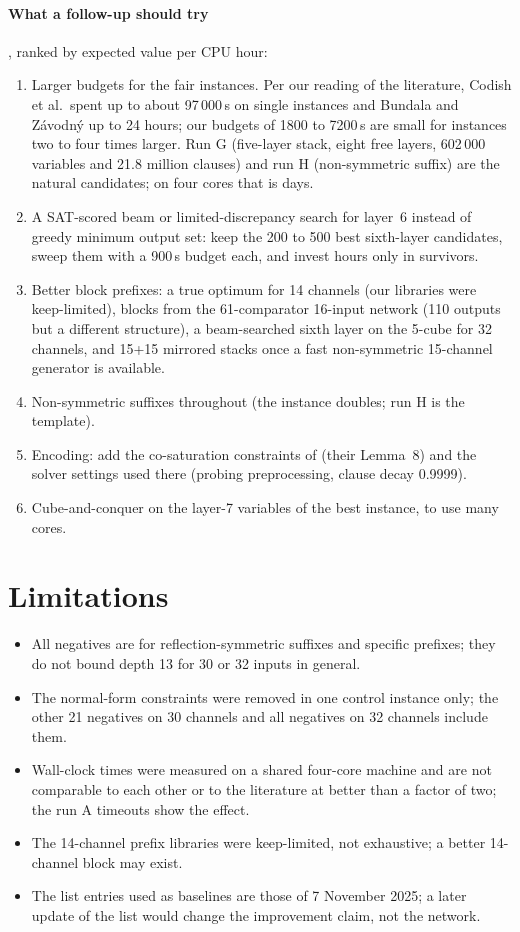 \documentclass[11pt,a4paper]{article}
\theoremstyle{plain}
\theoremstyle{definition}
\theoremstyle{remark}
\begin{document}
\paragraph{What a follow-up should try}, ranked by expected value per CPU hour:
\begin{enumerate}
\item Larger budgets for the fair instances. Per our reading of the literature, Codish et al.\ spent up to about 97\,000\,s on single instances and Bundala and Z\'avodn\'y up to 24 hours; our budgets of 1800 to 7200\,s are small for instances two to four times larger. Run G (five-layer stack, eight free layers, 602\,000 variables and 21.8 million clauses) and run H (non-symmetric suffix) are the natural candidates; on four cores that is days.
\item A SAT-scored beam or limited-discrepancy search for layer~6 instead of greedy minimum output set: keep the 200 to 500 best sixth-layer candidates, sweep them with a 900\,s budget each, and invest hours only in survivors.
\item Better block prefixes: a true optimum for 14 channels (our libraries were keep-limited), blocks from the 61-comparator 16-input network (110 outputs but a different structure), a beam-searched sixth layer on the 5-cube for 32 channels, and 15+15 mirrored stacks once a fast non-symmetric 15-channel generator is available.
\item Non-symmetric suffixes throughout (the instance doubles; run H is the template).
\item Encoding: add the co-saturation constraints of \cite{CCEMS19} (their Lemma~8) and the solver settings used there (probing preprocessing, clause decay 0.9999).
\item Cube-and-conquer on the layer-7 variables of the best instance, to use many cores.
\end{enumerate}

\section{Limitations}\label{sec:limits}

\begin{itemize}
\item All negatives are for reflection-symmetric suffixes and specific prefixes; they do not bound depth 13 for 30 or 32 inputs in general.
\item The normal-form constraints were removed in one control instance only; the other 21 negatives on 30 channels and all negatives on 32 channels include them.
\item Wall-clock times were measured on a shared four-core machine and are not comparable to each other or to the literature at better than a factor of two; the run A timeouts show the effect.
\item The 14-channel prefix libraries were keep-limited, not exhaustive; a better 14-channel block may exist.
\item The list entries used as baselines are those of 7 November 2025; a later update of the list would change the improvement claim, not the network.
\end{itemize}
\end{document}
